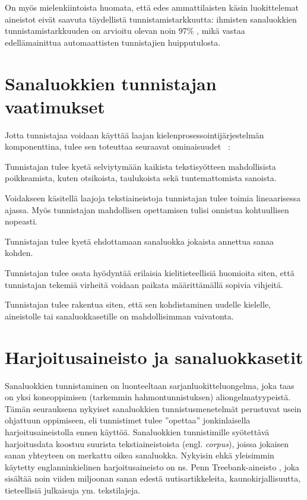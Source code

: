 \documentclass[utf8,bachelor,manualbib]{gradu3}
\begin{document}
On myös mielenkiintoista huomata, että edes ammattilaisten käsin luokittelemat aineistot eivät saavuta täydellistä tunnistamistarkkuutta: ihmisten sanaluokkien tunnistamistarkkuuden on arvioitu olevan noin 97\% \citep{manning2011}, mikä vastaa edellämainittua automaattisten tunnistajien huipputulosta.


\section{Sanaluokkien tunnistajan vaatimukset}

Jotta tunnistajaa voidaan käyttää laajan kielenprosessointijärjestelmän komponenttina, tulee sen toteuttaa seuraavat ominaisuudet ~\citep{cutting1992}: 

\begin{description}[labelindent=1cm]
 \item[Kestävyys] Tunnistajan tulee kyetä selviytymään kaikista tekstisyötteen mahdollisista poikkeamista, kuten otsikoista, taulukoista sekä tuntemattomista sanoista.
 \item[Tehokkuus] Voidakseen käsitellä laajoja tekstiaineistoja tunnistajan tulee toimia lineaarisessa ajassa. Myös tunnistajan mahdollisen opettamisen tulisi onnistua kohtuullisen nopeasti.
 \item[Tarkkuus] Tunnistajan tulee kyetä ehdottamaan sanaluokka jokaista annettua sanaa kohden.
 \item[Viritettävyys] Tunnistajan tulee osata hyödyntää erilaisia kielitieteellisiä huomioita siten, että tunnistajan tekemiä virheitä voidaan paikata määrittämällä sopivia vihjeitä.
 \item[Uudelleenkäytettävyys] Tunnistajan tulee rakentua siten, että sen kohdistaminen uudelle kielelle, aineistolle tai sanaluokkasetille on mahdollisimman vaivatonta.
\end{description}

\section{Harjoitusaineisto ja sanaluokkasetit}

Sanaluokkien tunnistaminen on luonteeltaan sarjanluokitteluongelma, joka taas on yksi koneoppimisen (tarkemmin hahmontunnistuksen) aliongelmatyypeistä. Tämän seurauksena nykyiset sanaluokkien tunnistusmenetelmät perustuvat usein ohjattuun oppimiseen, eli tunnistimet tulee ''opettaa'' jonkinlaisella harjoitusaineistolla ennen käyttöä. Sanaluokkien tunnistimille syötettävä harjoitusdata koostuu suurista tekstiaineistoista (engl. \textit{corpus}), joissa jokaisen sanan yhteyteen on merkattu oikea sanaluokka. Nykyisin ehkä yleisimmin käytetty englanninkielinen harjoitusaineisto on ns. Penn Treebank-aineisto \citep{marcus1993}, joka sisältää noin viiden miljoonan sanan edestä uutisartikkeleita, kaunokirjallisuutta, tieteellisiä julkaisuja ym. tekstilajeja.
\end{document}
